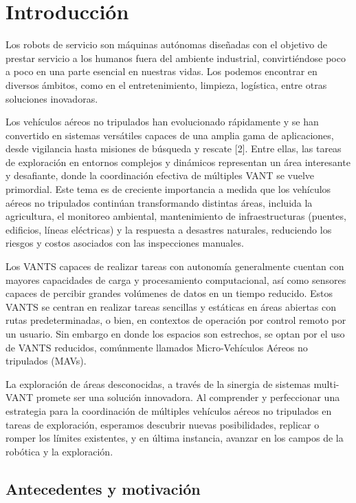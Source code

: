 \chapter{Introducción}

Los robots de servicio son máquinas autónomas diseñadas con el objetivo de prestar servicio a los humanos fuera del ambiente industrial, convirtiéndose poco a poco en una parte esencial en nuestras vidas. Los podemos encontrar en diversos ámbitos, como en el entretenimiento, limpieza, logística, entre otras soluciones inovadoras.

Los vehículos aéreos no tripulados han evolucionado rápidamente y se han convertido en sistemas versátiles capaces de una amplia gama de aplicaciones, desde vigilancia hasta misiones de búsqueda y rescate [2]. Entre ellas, las tareas de exploración en entornos complejos y dinámicos representan un área interesante y
desafiante, donde la coordinación efectiva de múltiples VANT se vuelve primordial. Este tema es de creciente importancia a medida que los vehículos aéreos no tripulados continúan transformando distintas áreas, incluida la agricultura, el monitoreo ambiental, mantenimiento de infraestructuras (puentes, edificios, líneas eléctricas) y la respuesta a desastres naturales, reduciendo los riesgos y costos asociados con las inspecciones manuales.

Los VANTS capaces de realizar tareas con autonomía generalmente cuentan con mayores capacidades de carga y procesamiento computacional, así como sensores capaces de percibir grandes volúmenes de datos en un tiempo reducido. Estos VANTS se centran en realizar tareas sencillas y estáticas en áreas abiertas con rutas
predeterminadas, o bien, en contextos de operación por control remoto por un usuario. Sin embargo en donde los espacios son estrechos, se optan por el uso de VANTS reducidos, comúnmente llamados Micro-Vehículos Aéreos no tripulados (MAVs).

La exploración de áreas desconocidas, a través de la sinergia de sistemas multi-VANT promete ser una solución innovadora. Al comprender y perfeccionar una estrategia para la coordinación de múltiples vehículos aéreos no tripulados en tareas de exploración, esperamos descubrir nuevas posibilidades, replicar o romper los límites existentes, y en última instancia, avanzar en los campos de la robótica y la exploración.

\section{Antecedentes y motivación} 


